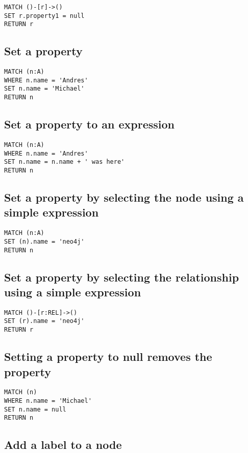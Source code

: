 \begin{lstlisting}
MATCH ()-[r]->()
SET r.property1 = null
RETURN r
\end{lstlisting}

\subsection{Set a property}

\begin{lstlisting}
MATCH (n:A)
WHERE n.name = 'Andres'
SET n.name = 'Michael'
RETURN n
\end{lstlisting}

\subsection{Set a property to an expression}

\begin{lstlisting}
MATCH (n:A)
WHERE n.name = 'Andres'
SET n.name = n.name + ' was here'
RETURN n
\end{lstlisting}

\subsection{Set a property by selecting the node using a simple expression}

\begin{lstlisting}
MATCH (n:A)
SET (n).name = 'neo4j'
RETURN n
\end{lstlisting}

\subsection{Set a property by selecting the relationship using a simple expression}

\begin{lstlisting}
MATCH ()-[r:REL]->()
SET (r).name = 'neo4j'
RETURN r
\end{lstlisting}

\subsection{Setting a property to null removes the property}

\begin{lstlisting}
MATCH (n)
WHERE n.name = 'Michael'
SET n.name = null
RETURN n
\end{lstlisting}

\subsection{Add a label to a node}

